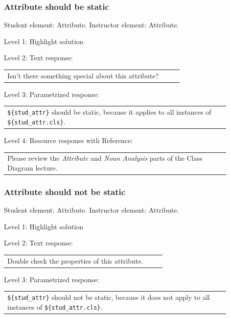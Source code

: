 \subsubsection{Attribute should be static}

Student element: Attribute. Instructor element: Attribute. \medskip

\noindent Level 1: Highlight solution  \medskip

\noindent Level 2: Text response: \medskip

\begin{tabular}{|p{0.9\linewidth}}
Isn't there something special about this attribute?
\end{tabular} \medskip

\noindent Level 3: Parametrized response: \medskip

\begin{tabular}{|p{0.9\linewidth}}
\verb|${stud_attr}| should be static, because it applies to all instances of \verb|${stud_attr.cls}|.
\end{tabular} \medskip

\noindent Level 4: Resource response with Reference: \medskip

\begin{tabular}{|p{0.9\linewidth}}
Please review the \textit{Attribute} and \textit{Noun Analysis} parts of the Class Diagram lecture.
\end{tabular} \medskip


\subsubsection{Attribute should not be static}

Student element: Attribute. Instructor element: Attribute. \medskip

\noindent Level 1: Highlight solution  \medskip

\noindent Level 2: Text response: \medskip

\begin{tabular}{|p{0.9\linewidth}}
Double check the properties of this attribute.
\end{tabular} \medskip

\noindent Level 3: Parametrized response: \medskip

\begin{tabular}{|p{0.9\linewidth}}
\verb|${stud_attr}| should not be static, because it does not apply to all instances of \verb|${stud_attr.cls}|.
\end{tabular} \medskip

